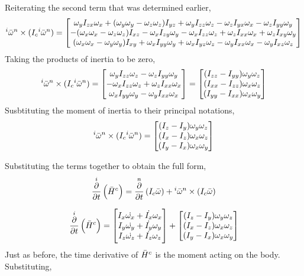 \documentclass[class=report, 12pt, crop=false]{standalone}
\begin{document}
\begin{center}
Reiterating the second term that was determined earlier,
$${}^i\bar{\omega}^n\times (I_c {}^i\bar{\omega}^n) = \begin{bmatrix}
\omega_yI_{zx}\omega_x + (\omega_y\omega_y - \omega_z\omega_z)I_{yz} + \omega_yI_{zz}\omega_z - \omega_zI_{yx}\omega_x - \omega_zI_{yy}\omega_y \\
-(\omega_x\omega_x - \omega_z\omega_z)I_{xz} - \omega_xI_{zy}\omega_y - \omega_xI_{zz}\omega_z + \omega_zI_{xx}\omega_x + \omega_zI_{xy}\omega_y \\
(\omega_x\omega_x - \omega_y\omega_y)I_{xy} + \omega_xI_{yy}\omega_y + \omega_xI_{yz}\omega_z - \omega_yI_{xx}\omega_x  - \omega_yI_{xz}\omega_z
\end{bmatrix}$$
Taking the products of inertia to be zero,
$${}^i\bar{\omega}^n\times (I_c {}^i\bar{\omega}^n) = \begin{bmatrix}
\omega_yI_{zz}\omega_z - \omega_zI_{yy}\omega_y \\
 - \omega_xI_{zz}\omega_z + \omega_zI_{xx}\omega_x \\
\omega_xI_{yy}\omega_y - \omega_yI_{xx}\omega_x
\end{bmatrix} = \begin{bmatrix}
(I_{zz} - I_{yy})\omega_y\omega_z \\
(I_{xx} - I_{zz})\omega_x\omega_z \\
(I_{yy} - I_{xx})\omega_x\omega_y
\end{bmatrix}$$ 
Susbtituting the moment of inertia to their principal notations,
$${}^i\bar{\omega}^n\times (I_c {}^i\bar{\omega}^n)= \begin{bmatrix}
(I_{z} - I_{y})\omega_y\omega_z \\
(I_{x} - I_{z})\omega_x\omega_z \\
(I_{y} - I_{x})\omega_x\omega_y
\end{bmatrix}$$

Substituting the terms together to obtain the full form,
$$\overset{i}{\frac{\partial}{\partial t}}\left(\bar{H}^c\right) = \overset{n}{\frac{\partial}{\partial t}}\left(I_c \bar{\omega}\right) + {}^i\bar{\omega}^n\times (I_c \bar{\omega})$$

$$\overset{i}{\frac{\partial}{\partial t}}\left(\bar{H}^c\right) = 
\begin{bmatrix}
I_x\dot{\omega_x}+\dot{I_x}\omega_x \\
I_y\dot{\omega_y}+\dot{I_y}\omega_y \\
I_z\dot{\omega_z}+\dot{I_z}\omega_z
\end{bmatrix} + \begin{bmatrix}
(I_{z} - I_{y})\omega_y\omega_z \\
(I_{x} - I_{z})\omega_x\omega_z \\
(I_{y} - I_{x})\omega_x\omega_y
\end{bmatrix}$$
Just as before, the time derivative of $\bar{H}^c$ is the moment acting on the body. Substituting,
\\~\\





\end{center}
\end{document}
